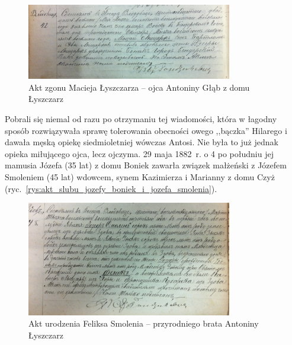 \begin{figure}[!h]
\begin{center}
\includegraphics[width=0.8\textwidth]{zdjecia/akt_zgonu_macieja_lyszczarza.jpg}
\caption[Akt zgonu Macieja Łyszczarza]{Akt zgonu Macieja Łyszczarza -- ojca Antoniny Głąb z domu Łyszczarz}
\label{rys:akt_zgonu_macieja_lyszczarza.jpg}
\end{center}
\end{figure}

Pobrali się niemal od razu po otrzymaniu tej wiadomości, która w łagodny sposób rozwiązywała sprawę tolerowania obecności owego ,,bączka'' Hilarego i dawała męską opiekę siedmioletniej wówczas Antosi. Nie była to już jednak opieka miłującego ojca, lecz ojczyma. 29 maja 1882~r. o 4 po południu jej mamusia Józefa (35 lat) z domu Boniek zawarła związek małżeński z Józefem Smoleniem (45 lat) wdowcem, synem Kazimierza i Marianny z domu Czyż (ryc.~\ref{rys:akt_slubu_jozefy_boniek_i_jozefa_smolenia}).

\begin{figure}[!h]
\begin{center}
\includegraphics[width=0.8\textwidth]{zdjecia/akt_urodzenia_feliksa_smolenia.jpg}
\caption[Akt urodzenia Feliksa Smolenia]{Akt urodzenia Feliksa Smolenia -- przyrodniego brata Antoniny  Łyszczarz}
\label{rys:akt_urodzenia_feliksa_smolenia}
\end{center}
\end{figure}


